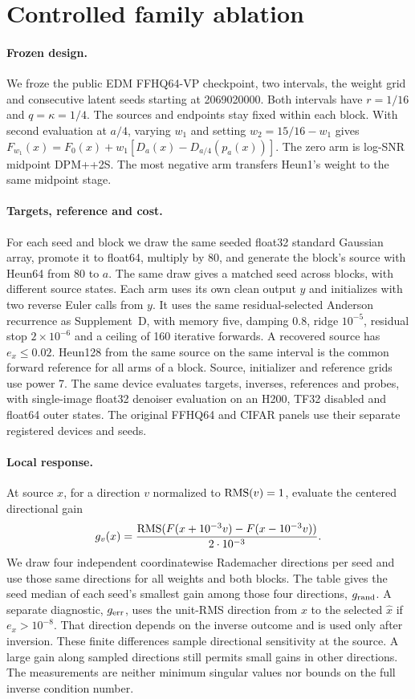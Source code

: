 \section{Controlled family ablation}
\label{sec:controlled}

\paragraph{Frozen design.}
We froze the public EDM FFHQ64-VP checkpoint, two intervals, the weight grid and \SweepN{} consecutive latent seeds starting at 2069020000. Both intervals have $r=1/16$ and $q=\kappa=1/4$. The sources and endpoints stay fixed within each block. With second evaluation at $a/4$, varying $w_1$ and setting $w_2=15/16-w_1$ gives $F_{w_1}(x)=F_0(x)+w_1[D_a(x)-D_{a/4}(p_a(x))]$. The zero arm is log-SNR midpoint DPM++2S. The most negative arm transfers Heun1's weight to the same midpoint stage.

\paragraph{Targets, reference and cost.}
For each seed and block we draw the same seeded float32 standard Gaussian array, promote it to float64, multiply by $80$, and generate the block's source with Heun64 from 80 to $a$. The same draw gives a matched seed across blocks, with different source states. Each arm uses its own clean output $y$ and initializes with two reverse Euler calls from $y$. It uses the same residual-selected Anderson recurrence as Supplement~D, with memory five, damping $0.8$, ridge $10^{-5}$, residual stop $2\times10^{-6}$ and a ceiling of 160 iterative forwards. A recovered source has $e_x\le0.02$. Heun128 from the same source on the same interval is the common forward reference for all arms of a block. Source, initializer and reference grids use power 7. The same device evaluates targets, inverses, references and probes, with single-image float32 denoiser evaluation on an H200, TF32 disabled and float64 outer states. The original FFHQ64 and CIFAR panels use their separate registered devices and seeds.

\paragraph{Local response.}
At source $x$, for a direction $v$ normalized to $\operatorname{RMS}(v)=1$, evaluate the centered directional gain
\[
 g_v(x)=\frac{\operatorname{RMS}(F(x+10^{-3}v)-F(x-10^{-3}v))}{2\cdot10^{-3}}.
\]
We draw four independent coordinatewise Rademacher directions per seed and use those same directions for all weights and both blocks. The table gives the seed median of each seed's smallest gain among those four directions, $g_{\rm rand}$. A separate diagnostic, $g_{\rm err}$, uses the unit-RMS direction from $x$ to the selected $\widehat x$ if $e_x>10^{-8}$. That direction depends on the inverse outcome and is used only after inversion. These finite differences sample directional sensitivity at the source. A large gain along sampled directions still permits small gains in other directions. The measurements are neither minimum singular values nor bounds on the full inverse condition number.

